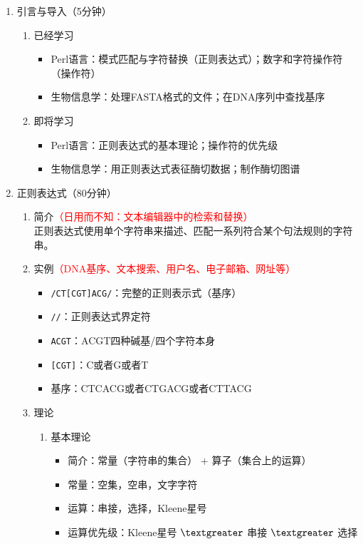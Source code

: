 \documentclass{TIJMUjiaoanLL}
\begin{document}
\begin{enumerate}
  \item 引言与导入（5分钟）
    \begin{enumerate}
      \item 已经学习
	\begin{itemize}
	  \item Perl语言：模式匹配与字符替换（正则表达式）；数字和字符操作符（操作符）
	  \item 生物信息学：处理FASTA格式的文件；在DNA序列中查找基序
	\end{itemize}
      \item 即将学习
	\begin{itemize}
	  \item Perl语言：正则表达式的基本理论；操作符的优先级
	  \item 生物信息学：用正则表达式表征酶切数据；制作酶切图谱
	\end{itemize}
    \end{enumerate}
  \item 正则表达式（80分钟）
    \begin{enumerate}
      \item 简介\textcolor{red}{（日用而不知：文本编辑器中的检索和替换）}
	\\正则表达式使用单个字符串来描述、匹配一系列符合某个句法规则的字符串。
      \item 实例\textcolor{red}{（DNA基序、文本搜索、用户名、电子邮箱、网址等）}
	\begin{itemize}
	  \item \verb|/CT[CGT]ACG/|：完整的正则表示式（基序）
	  \item \verb|//|：正则表达式界定符
	  \item \verb|ACGT|：ACGT四种碱基/四个字符本身
	  \item \verb|[CGT]|：C或者G或者T
	  \item 基序：CTCACG或者CTGACG或者CTTACG
	\end{itemize}
      \item 理论
	\begin{enumerate}
	  \item 基本理论
	    \begin{itemize}
	      \item 简介：常量（字符串的集合） + 算子（集合上的运算）
	      \item 常量：空集，空串，文字字符
	      \item 运算：串接，选择，Kleene星号
	      \item 运算优先级：Kleene星号 $\textgreater$ 串接 $\textgreater$ 选择

\end{itemize}
\end{enumerate}
\end{enumerate}
\end{enumerate}
\end{document}
